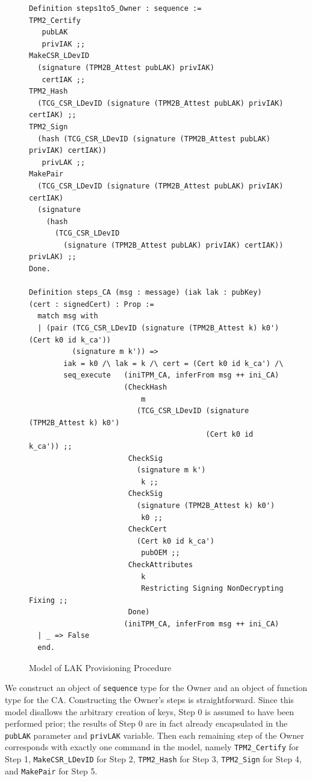\documentclass[runningheads]{llncs}
\begin{document}
\begin{figure}[hpbt]
\begin{lstlisting}[language=Coq]
Definition steps1to5_Owner : sequence :=
TPM2_Certify 
   pubLAK 
   privIAK ;;
MakeCSR_LDevID 
  (signature (TPM2B_Attest pubLAK) privIAK) 
   certIAK ;;
TPM2_Hash 
  (TCG_CSR_LDevID (signature (TPM2B_Attest pubLAK) privIAK) certIAK) ;;
TPM2_Sign 
  (hash (TCG_CSR_LDevID (signature (TPM2B_Attest pubLAK) privIAK) certIAK)) 
   privLAK ;;
MakePair 
  (TCG_CSR_LDevID (signature (TPM2B_Attest pubLAK) privIAK) certIAK) 
  (signature
    (hash
      (TCG_CSR_LDevID
        (signature (TPM2B_Attest pubLAK) privIAK) certIAK)) privLAK) ;;
Done. 

Definition steps_CA (msg : message) (iak lak : pubKey) (cert : signedCert) : Prop :=
  match msg with
  | (pair (TCG_CSR_LDevID (signature (TPM2B_Attest k) k0') (Cert k0 id k_ca'))
          (signature m k')) =>
        iak = k0 /\ lak = k /\ cert = (Cert k0 id k_ca') /\
        seq_execute   (iniTPM_CA, inferFrom msg ++ ini_CA)
                      (CheckHash 
                          m
                         (TCG_CSR_LDevID (signature (TPM2B_Attest k) k0')
                                         (Cert k0 id k_ca')) ;;
                       CheckSig
                         (signature m k') 
                          k ;;
                       CheckSig 
                         (signature (TPM2B_Attest k) k0') 
                          k0 ;;
                       CheckCert 
                         (Cert k0 id k_ca') 
                          pubOEM ;;
                       CheckAttributes 
                          k 
                          Restricting Signing NonDecrypting Fixing ;;
                       Done)
                      (iniTPM_CA, inferFrom msg ++ ini_CA)
  | _ => False
  end.
\end{lstlisting}
\caption{Model of LAK Provisioning Procedure}
\label{fig:lak_model}
\end{figure}

We construct an object of \verb|sequence| type for the Owner and an object of function type for the CA. Constructing the Owner's steps is straightforward. Since this model disallows the arbitrary creation of keys, Step 0 is assumed to have been performed prior; the results of Step 0 are in fact already encapsulated in the \verb|pubLAK| parameter and \verb|privLAK| variable. Then each remaining step of the Owner corresponds with exactly one command in the model, namely \verb|TPM2_Certify| for Step 1, \verb|MakeCSR_LDevID| for Step 2, \verb|TPM2_Hash| for Step 3, \verb|TPM2_Sign| for Step 4, and \verb|MakePair| for Step 5. 
\end{document}
